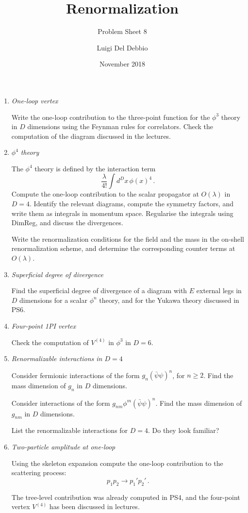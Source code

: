 \documentclass{tutorial}
\subtitle{Problem Sheet 8}
\title{Renormalization}
\author{Luigi Del Debbio}
\date{November 2018}
\newcommand{\psibar}{\bar{\psi}}
\begin{document}
\maketitle

\begin{enumerate}
\item \emph{ One-loop vertex}

  Write the one-loop contribution to the three-point function for the
  $\phi^3$ theory in $D$ dimensions using the Feynman rules for
  correlators. Check the computation of the diagram discussed in the
  lectures. 
  
\item \emph{ $\phi^4$ theory}

  The $\phi^4$ theory is defined by the interaction term
  \[
    \frac{\lambda}{4!} \int d^Dx\, \phi(x)^4\, .
  \]
  Compute the one-loop contribution to the scalar propagator at
  $O(\lambda)$ in $D=4$. Identify the relevant diagrams, compute the symmetry
  factors, and write them as integrals in momentum space. Regularise
  the integrals using DimReg, and discuss the divergences.

  Write the renormalization conditions for the field and the mass in
  the on-shell renormalization scheme, and determine the corresponding
  counter terms at $O(\lambda)$.

\item \emph{ Superficial degree of divergence}

  Find the superficial degree of divergence of a diagram with $E$
  external legs in $D$ dimensions for a scalar $\phi^n$ theory, and for
  the Yukawa theory discussed in PS6.
  
\item \emph{ Four-point 1PI vertex}
  
  Check the computation of $V^{(4)}$ in $\phi^3$ in $D=6$.
  
\item \emph{ Renormalizable interactions in $D=4$}
  
  Consider fermionic interactions of the form $g_n (\psibar\psi)^n$,
  for $n \geq 2$. Find the mass dimension of $g_n$ in $D$ dimensions.
  
  Consider interactions of the form $g_{nm} \phi^m
  (\psibar\psi)^n$. Find the mass dimension of $g_{nm}$ in $D$
  dimensions.
  
  List the renormalizable interactions for $D=4$. Do they look
  familiar? 

\item \emph{ Two-particle amplitude at one-loop}

  Using the skeleton expansion compute the one-loop contribution to
  the scattering process:
  \[
    p_1 p_2 \rightarrow p_1' p_2'\, .
  \]

  The tree-level contribution was already computed in PS4, and the
  four-point vertex $V^{(4)}$ has been discussed in lectures.
  
\end{enumerate}
\end{document}
